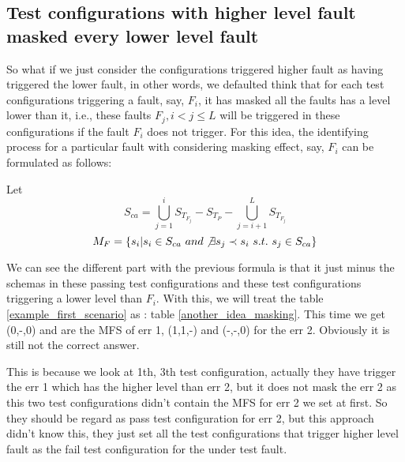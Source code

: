 \documentclass{sig-alternate}
\begin{document}
\subsection{Test configurations with higher level fault masked every lower level fault}

So what if we just consider the configurations triggered higher fault as having triggered the lower fault, in other words, we defaulted think that for each test configurations triggering a fault, say, $F_{i}$, it has masked all the faults has a level lower than it, i.e., these faults $F_{j}, i < j \leq L $ will be triggered in these configurations if the fault $F_{i}$ does not trigger. For this idea, the identifying process for a particular fault with considering masking effect, say, $F_{i}$ can be formulated as follows:

Let $$S_{ca} =\bigcup_{j = 1}^{i}S_{T_{F_{j}}} - S_{T_{P}} - \bigcup_{j = i+1}^{L}S_{T_{F_{j}}}$$
$$M_{F} = \{s_{i} | s_{i} \in S_{ca}\ and \not\exists s_{j} \prec s_{i}\ s.t.\ s_{j} \in S_{ca} \}$$

We can see the different part with the previous formula is that it just minus the schemas in these passing test configurations and these test configurations triggering a lower level than $F_{i}$. With this, we will treat the table \ref{example_first_scenario} as : table \ref{another_idea_masking}.  This time we get  (0,-,0) and  are the MFS of err 1, (1,1,-) and (-,-,0) for the err 2. Obviously it is still not the correct answer.

This is because we look at 1th, 3th test configuration, actually they have trigger the err 1 which has the higher level than err 2, but it does not mask the err 2 as this two test configurations didn't contain the MFS for err 2 we set at first. So they should be regard as pass test configuration for err 2, but this approach didn't know this, they just set all the test configurations that trigger higher level fault as the fail test configuration for the under test fault.
\end{document}
